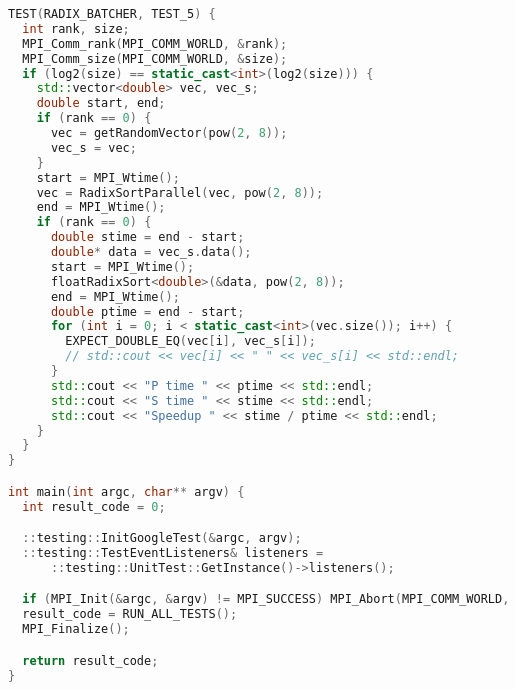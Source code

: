 \documentclass{report}
\begin{document}
\begin{lstlisting}[language=C++]
TEST(RADIX_BATCHER, TEST_5) {
  int rank, size;
  MPI_Comm_rank(MPI_COMM_WORLD, &rank);
  MPI_Comm_size(MPI_COMM_WORLD, &size);
  if (log2(size) == static_cast<int>(log2(size))) {
    std::vector<double> vec, vec_s;
    double start, end;
    if (rank == 0) {
      vec = getRandomVector(pow(2, 8));
      vec_s = vec;
    }
    start = MPI_Wtime();
    vec = RadixSortParallel(vec, pow(2, 8));
    end = MPI_Wtime();
    if (rank == 0) {
      double stime = end - start;
      double* data = vec_s.data();
      start = MPI_Wtime();
      floatRadixSort<double>(&data, pow(2, 8));
      end = MPI_Wtime();
      double ptime = end - start;
      for (int i = 0; i < static_cast<int>(vec.size()); i++) {
        EXPECT_DOUBLE_EQ(vec[i], vec_s[i]);
        // std::cout << vec[i] << " " << vec_s[i] << std::endl;
      }
      std::cout << "P time " << ptime << std::endl;
      std::cout << "S time " << stime << std::endl;
      std::cout << "Speedup " << stime / ptime << std::endl;
    }
  }
}

int main(int argc, char** argv) {
  int result_code = 0;

  ::testing::InitGoogleTest(&argc, argv);
  ::testing::TestEventListeners& listeners =
      ::testing::UnitTest::GetInstance()->listeners();

  if (MPI_Init(&argc, &argv) != MPI_SUCCESS) MPI_Abort(MPI_COMM_WORLD, -1);
  result_code = RUN_ALL_TESTS();
  MPI_Finalize();

  return result_code;
}

\end{lstlisting}
\end{document}
